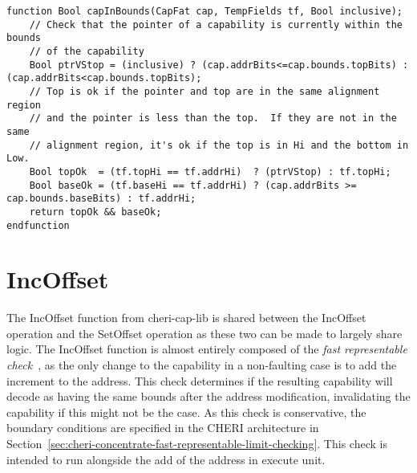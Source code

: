 \begin{lstlisting}[language=bluespec]
function Bool capInBounds(CapFat cap, TempFields tf, Bool inclusive);
    // Check that the pointer of a capability is currently within the bounds
    // of the capability
    Bool ptrVStop = (inclusive) ? (cap.addrBits<=cap.bounds.topBits) : (cap.addrBits<cap.bounds.topBits);
    // Top is ok if the pointer and top are in the same alignment region
    // and the pointer is less than the top.  If they are not in the same
    // alignment region, it's ok if the top is in Hi and the bottom in Low.
    Bool topOk  = (tf.topHi == tf.addrHi)  ? (ptrVStop) : tf.topHi;
    Bool baseOk = (tf.baseHi == tf.addrHi) ? (cap.addrBits >= cap.bounds.baseBits) : tf.addrHi;
    return topOk && baseOk;
endfunction
\end{lstlisting}

\section{IncOffset}
\label{sec:cheri-128-listings-incoffset}

The IncOffset function from cheri-cap-lib is shared between the IncOffset operation and the SetOffset operation as these two can be made to largely share logic.
The IncOffset function is almost entirely composed of the \emph{fast representable check}~\cite{Woodruff2019}, as the only change to the capability in a non-faulting case is to add the increment to the address.
This check determines if the resulting capability will decode as having the same bounds after the address modification, invalidating the capability if this might not be the case.
As this check is conservative, the boundary conditions are specified in the CHERI architecture in Section~\ref{sec:cheri-concentrate-fast-representable-limit-checking}.
This check is intended to run alongside the add of the address in execute unit.


